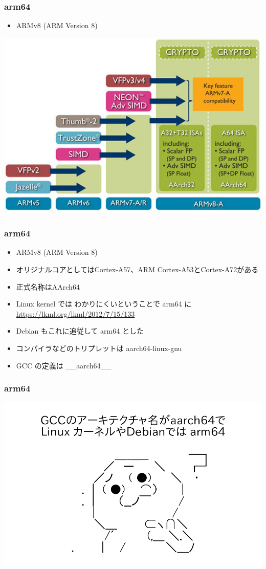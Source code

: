 \documentclass[cjk,dvipdfmx,10pt,compress,%
hyperref={bookmarks=true,bookmarksnumbered=true,bookmarksopen=false,%
colorlinks=false,%
pdftitle={第 103 回 関西 Debian 勉強会},%
pdfauthor={岩松 信洋},%
pdfsubject={資料},%
}]{beamer}
\begin{document}
\begin{frame}[fragile]
  \frametitle{arm64}
  \begin{itemize}
  \item ARMv8 (ARM Version 8)
  \end{itemize}
  \begin{center}
  \includegraphics[width=0.7\hsize]{image201511/V5_to_V8_Architecture.jpg}
  \end{center}
\end{frame}

\begin{frame}[fragile]
  \frametitle{arm64}

\begin{minipage}{0.7\hsize}
\begin{itemize}
\item ARMv8 (ARM Version 8)
\item オリジナルコアとしてはCortex-A57、ARM Cortex-A53とCortex-A72がある
\item 正式名称はAArch64
\item Linux kernel では わかりにくいということで arm64 に\\
\url{https://lkml.org/lkml/2012/7/15/133}
\item Debian もこれに追従して arm64 とした
\item コンパイラなどのトリプレットは aarch64-linux-gnu 
\item GCC の定義は \_\_aarch64\_\_ 
\end{itemize}
\end{minipage}

\end{frame}

\begin{frame}[fragile]
  \frametitle{arm64}

  \begin{center}
  \includegraphics[width=0.8\hsize]{image201511/yaruoAA.png}
  \end{center}
\end{frame}
\end{document}
